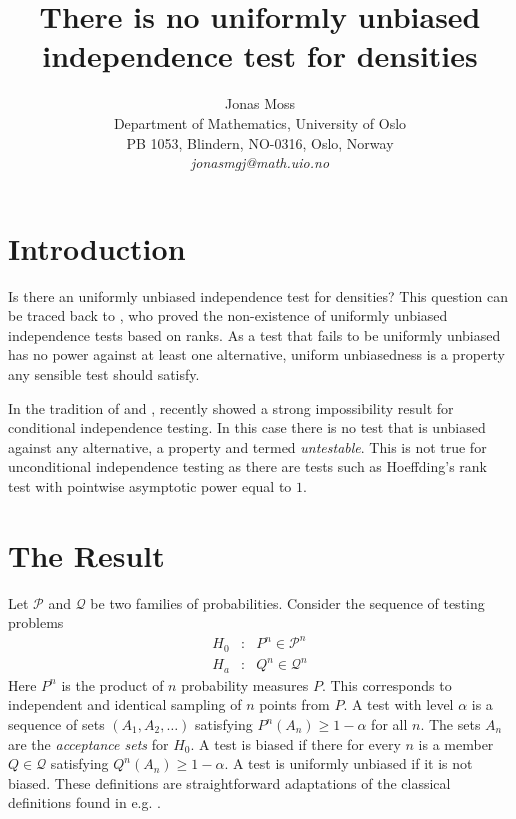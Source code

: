\documentclass[twoside]{article}
\title{There is no uniformly unbiased independence test for densities}
\author{
  Jonas Moss \orcid{0000-0002-6876-6964} \\
  Department of Mathematics, University of Oslo\\
  PB 1053, Blindern, NO-0316, Oslo, Norway \\
  \it{jonasmgj@math.uio.no}
}
\newcommand{\1}{\mathbf{1}}
\begin{document}
\maketitle


\section{Introduction}
Is there an uniformly unbiased independence test for densities? This question can be traced back to \citet{hoeffding1948non}, who proved the non-existence of uniformly unbiased independence tests based on ranks. As a test that fails to be uniformly unbiased has no power against at least one alternative, uniform unbiasedness is a property any sensible test should satisfy.

In the tradition of \citet{bahadur1956nonexistence} and \citet{romano2004non}, \citet{shah2018hardness} recently showed a strong impossibility result
for conditional independence testing. In this case there is no test
that is unbiased against any alternative, a property \citet{shah2018hardness} and termed \emph{untestable}. This is not true
for unconditional independence testing as there are tests such as
Hoeffding's rank test \citep{hoeffding1948non} with pointwise asymptotic
power equal to $1$.

\section{The Result}
Let $\mathcal{P}$ and $\mathcal{Q}$ be two families of probabilities.
Consider the sequence of testing problems
\begin{eqnarray*}
H_{0} & : & P^{n}\in\mathcal{P}^{n}\\
H_{a} & : & Q^{n}\in\mathcal{Q}^{n}
\end{eqnarray*}
Here $P^{n}$ is the product of $n$ probability measures $P$. This
corresponds to independent and identical sampling of $n$ points from
$P$. A test with level $\alpha$ is a sequence of sets $\left(A_{1},A_{2},\ldots\right)$
satisfying $P^{n}\left(A_{n}\right)\geq1-\alpha$ for all $n$. The
sets $A_{n}$ are the \emph{acceptance sets }for $H_{0}$. A test\emph{
}is biased if there for every $n$ is a member $Q\in\mathcal{Q}$
satisfying $Q^{n}\left(A_{n}\right)\geq1-\alpha$. A test is uniformly unbiased
if it is not biased. These definitions are straightforward adaptations
of the classical definitions found in e.g. \citet{lehmann2006testing}.
\end{document}
